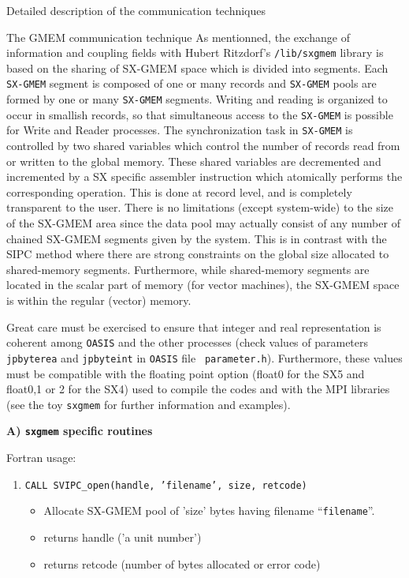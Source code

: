 \begin{section}{Detailed description of the communication techniques}
\begin{subsection}{The GMEM communication technique}
As mentionned, the exchange of information and coupling fields with 
Hubert Ritzdorf's {\tt /lib/sxgmem} library is based on the sharing of SX-GMEM
space which is divided into segments. Each {\tt SX-GMEM} segment
is composed of one or many records and {\tt SX-GMEM} pools are formed
by one or many {\tt SX-GMEM} segments. 
Writing and reading is organized to occur in smallish records,
so that simultaneous access to the {\tt SX-GMEM} is possible for
Write and Reader processes. The synchronization task in  {\tt SX-GMEM} 
is controlled by two shared variables which control the number of records
read from or written to the global memory.  These shared variables
are decremented and incremented by a SX specific assembler instruction
which atomically performs the corresponding operation.
This is done
at record level, and is completely transparent to the user.
There is no limitations (except system-wide)
to the size of the SX-GMEM area since the data pool may actually consist 
of any number of chained SX-GMEM segments given by the system. This is in
contrast with the SIPC method where there are strong constraints on the
global size allocated to shared-memory segments. Furthermore, while 
shared-memory segments are located in the scalar part of memory (for
vector machines), the SX-GMEM space is within the regular (vector) memory.

Great care must be exercised to ensure that integer and real representation
is coherent among {\tt OASIS} and the other processes (check values of
parameters {\tt jpbyterea} and {\tt jpbyteint} in {\tt OASIS} file {\tt
parameter.h}). Furthermore, these values must be compatible with the floating
point option (float0 for the SX5 and float0,1 or 2 for the SX4) used to compile the codes and with the MPI libraries (see the
toy {\tt sxgmem} for further information and examples).

\vspace{.6truecm}

{\bf A) {\tt sxgmem} specific routines}

\vspace{.3truecm}

Fortran usage:
\begin{enumerate}

\item {\tt CALL SVIPC\_open(handle, 'filename', size, retcode)}

 \begin{itemize}
     \item Allocate SX-GMEM pool of 'size' bytes having filename ``{\tt filename}''.
     \item returns handle ('a unit number')
     \item returns retcode (number of bytes allocated or error code)
 \end{itemize}


\end{enumerate}
\end{subsection}
\end{section}
